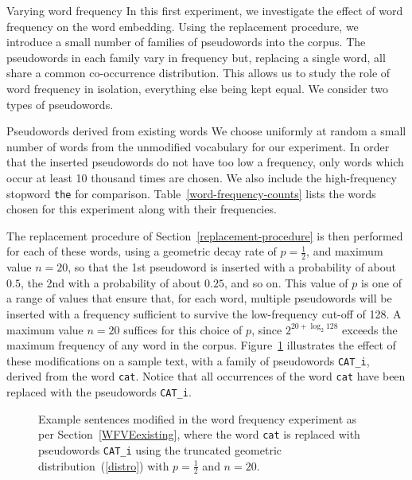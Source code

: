\documentclass{article} %
\newcommand{\word}[1]{\texttt{#1}}
\begin{document}
\begin{section}{Varying word frequency}\label{WFVE}
In this first experiment, we investigate the effect of word frequency on
the word embedding.  Using the replacement procedure, we introduce a
small number of families of pseudowords into the corpus.  The pseudowords in each
family vary in frequency but, replacing a single word, all share a
common co-occurrence distribution.  This allows us to study the role of
word frequency in isolation, everything else being kept equal.  We
consider two types of pseudowords.

\begin{subsection}{Pseudowords derived from existing words}\label{WFVEexisting}
We choose uniformly at random a small number of words from the
unmodified vocabulary for our experiment.  In order that the inserted
pseudowords do not have too low a frequency, only words which occur at least
10 thousand times are chosen.  We also include the high-frequency
stopword \word{the} for comparison.  Table~\ref{word-frequency-counts}
lists the words chosen for this experiment along with their frequencies.

The replacement procedure of Section~\ref{replacement-procedure} is then
performed for each of these words, using a geometric decay rate of $p =
\tfrac{1}{2}$, and maximum value $n=20$, so that the 1st pseudoword is
inserted with a probability of about $0.5$, the 2nd with a probability of
about $0.25$, and so on.  This value of $p$ is one of a range of values
that ensure that, for each word, multiple pseudowords will be inserted with a
frequency sufficient to survive the low-frequency cut-off of
128.  A maximum value $n=20$ suffices for this choice of $p$, since
$2^{20 + \log_2{128}}$ exceeds the maximum frequency of any word in
the corpus.  Figure~\ref{fig:word-frequency-experiment-text-cat}
illustrates the effect of these modifications on a sample text, with a
family of pseudowords \word{CAT\_i}, derived from the word \word{cat}.
Notice that all occurrences of the word \word{cat} have been replaced
with the pseudowords \word{CAT\_i}.

\begin{table}
	
	\caption{Words chosen for the word frequency experiment, along with their frequency in the unmodified corpus. }
	\label{word-frequency-counts}
\end{table}

\begin{figure}
	\begin{mdframed}
	
	\end{mdframed}
	\caption{Example sentences modified in the word frequency
          experiment as per Section~\ref{WFVEexisting}, where the word
          \word{cat} is replaced with pseudowords \word{CAT\_i} using the
          truncated geometric distribution~(\ref{distro}) with
          $p=\tfrac{1}{2}$ and $n=20$.}
	\label{fig:word-frequency-experiment-text-cat}
\end{figure}


\end{subsection}
\end{section}
\end{document}

